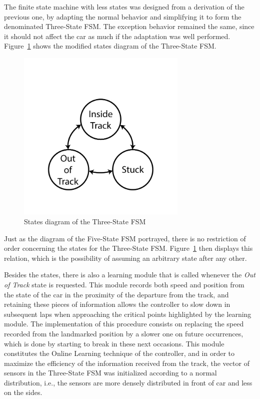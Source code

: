 	The finite state machine with less states was designed from a derivation of the previous one, by adapting the normal behavior and simplifying it to form the denominated Three-State FSM. The exception behavior remained the same, since it should not affect the car as much if the adaptation was well performed. Figure~\ref{Fig:FSM3Diagram} shows the modified states diagram of the Three-State FSM.
	
	\begin{figure}[h]
		
		\centering
		\includegraphics[width=230pt]{ThreeStateFSM}
		\caption{States diagram of the Three-State FSM}
		\label{Fig:FSM3Diagram}
		
	\end{figure}
	
	Just as the diagram of the Five-State FSM portrayed, there is no restriction of order concerning the states for the Three-State FSM. Figure~\ref{Fig:FSM3Diagram} then displays this relation, which is the possibility of assuming an arbitrary state after any other.
	
	Besides the states, there is also a learning module that is called whenever the \emph{Out of Track} state is requested. This module records both speed and position from the state of the car in the proximity of the departure from the track, and retaining these pieces of information allows the controller to slow down in subsequent laps when approaching the critical points highlighted by the learning module. The implementation of this procedure consists on replacing the speed recorded from the landmarked position by a slower one on future occurrences, which is done by starting to break in these next occasions. This module constitutes the Online Learning technique of the controller, and in order to maximize the efficiency of the information received from the track, the vector of sensors in the Three-State FSM was initialized according to a normal distribution, i.e., the sensors are more densely distributed in front of car and less on the sides.
	
